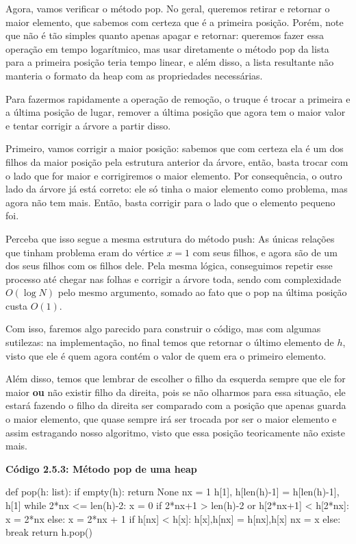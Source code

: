 \documentclass[11pt, a4paper]{article}
\begin{document}
Agora, vamos verificar o método pop. No geral, queremos retirar e retornar o maior elemento, que sabemos com certeza que é a primeira posição. Porém, note que não é tão simples quanto apenas apagar e retornar: queremos fazer essa operação em tempo logarítmico, mas usar diretamente o método pop da lista para a primeira posição teria tempo linear, e além disso, a lista resultante não manteria o formato da heap com as propriedades necessárias.

Para fazermos rapidamente a operação de remoção, o truque é trocar a primeira e a última posição de lugar, remover a última posição que agora tem o maior valor e tentar corrigir a árvore a partir disso.

Primeiro, vamos corrigir a maior posição: sabemos que com certeza ela é um dos filhos da maior posição pela estrutura anterior da árvore, então, basta trocar com o lado que for maior e corrigiremos o maior elemento. Por consequência, o outro lado da árvore já está correto: ele só tinha o maior elemento como problema, mas agora não tem mais. Então, basta corrigir para o lado que o elemento pequeno foi.

Perceba que isso segue a mesma estrutura do método push: As únicas relações que tinham problema eram do vértice \(x=1\) com seus filhos, e agora são de um dos seus filhos com os filhos dele. Pela mesma lógica, conseguimos repetir esse processo até chegar nas folhas e corrigir a árvore toda, sendo com complexidade \(O(\log N)\) pelo mesmo argumento, somado ao fato que o pop na última posição custa \(O(1)\).

Com isso, faremos algo parecido para construir o código, mas com algumas sutilezas: na implementação, no final temos que retornar o último elemento de \(h\), visto que ele é quem agora contém o valor de quem era o primeiro elemento. 

Além disso, temos que lembrar de escolher o filho da esquerda sempre que ele for maior \textbf{ou} não existir filho da direita, pois se não olharmos para essa situação, ele estará fazendo o filho da direita ser comparado com a posição que apenas guarda o maior elemento, que quase sempre irá ser trocada por ser o maior elemento e assim estragando nosso algoritmo, visto que essa posição teoricamente não existe mais.

\textbf{Código 2.5.3: Método pop de uma heap}

\begin{code}
def pop(h: list):
    if empty(h):
        return None
    nx = 1
    h[1], h[len(h)-1] = h[len(h)-1], h[1]
    while 2*nx <= len(h)-2:
        x = 0
        if 2*nx+1 > len(h)-2 or h[2*nx+1] < h[2*nx]:
            x = 2*nx
        else:
            x = 2*nx + 1
        if h[nx] < h[x]:
            h[x],h[nx] = h[nx],h[x]
            nx = x
        else:
            break
    return h.pop()
\end{code}
\end{document}
